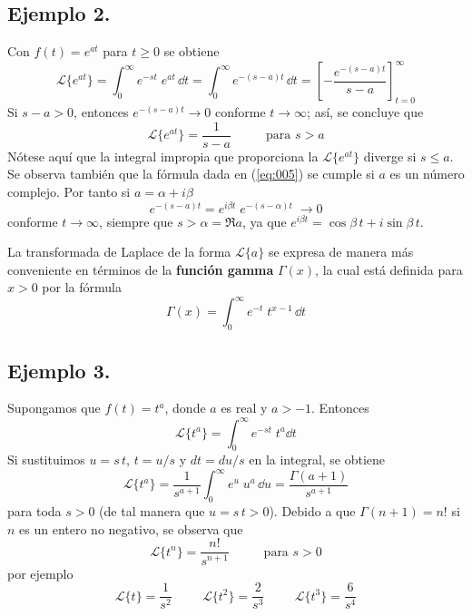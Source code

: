 \subsection*{Ejemplo 2.}
Con $f(t) = e^{at}$ para $t \geq 0$ se obtiene
\[ \mathscr{L} \{ e^{at} \} = \int_{0}^{\infty} e^{-st} \; e^{at} \, \dd t = \int_{0}^{\infty} e^{-(s - a)t} \, \dd t =  \left[ - \dfrac{e^{-(s - a)t}}{s - a} \right]_{t=0}^{\infty}  \]
Si $s -a > 0$, entonces $e^{-(s - a) t} \to 0$ conforme $t \to \infty$; así, se concluye que
\begin{equation}
\mathscr{L} \{ e^{at} \} = \dfrac{1}{s - a} \hspace{1cm} \mbox{ para } s > a
\label{eq:005}
\end{equation}
Nótese aquí que la integral impropia que proporciona la $\mathscr{L} \{ e^{at} \}$ diverge si $s \leq a$. Se observa también que la fórmula dada en (\ref{eq:005}) se cumple si $a$ es un número complejo. Por tanto si $a = \alpha + i \beta$
 \[ e^{-(s - a)t} = e^{i \beta t} \; e^{-(s - \alpha) t} \; \to 0 \]
conforme $t \to \infty$, siempre que $s > \alpha = \Re{a}$, ya que $e^{i \beta t} = \cos \beta \, t + i \sin \beta \, t$.
\par
La transformada de Laplace de la forma $\mathscr{L} \{ a \}$ se expresa de manera más conveniente en términos de la \textbf{función gamma} $\Gamma(x)$, la cual está definida para $x > 0$ por la fórmula
\begin{equation}
\Gamma (x) = \int_{0}^{\infty} e^{-t} \; t^{x-1} \, \dd t
\label{eq:006}
\end{equation}
\subsection*{Ejemplo 3.}
Supongamos que $f(t) = t^{a}$, donde $a$ es real y $a > -1$. Entonces
\[ \mathscr{L} \{ t^{a} \} = \int_{0}^{\infty} e^{-st} \; t^{a} \dd t \]
Si sustituimos $u = s \, t$, $t =  u/s$ y $dt = du/s$ en la integral, se obtiene
\begin{equation}
\mathscr{L} \{ t^{a} \} =  \dfrac{1}{s^{a+1}} \int_{0}^{\infty} e^{u} \; u^{a} \, \dd u = \dfrac{\Gamma(a + 1)}{s^{a + 1}}
\label{eq:010}
\end{equation}
para toda $s > 0$ (de tal manera que $u = s \, t > 0$). Debido a que $\Gamma(n+1) = n!$ si $n$ es un entero no negativo, se observa que
\begin{equation}
\mathscr{L} \{ t^{n} \} = \dfrac{n!}{s^{n+1}} \hspace{1cm} \mbox{ para } s > 0
\label{eq:011}
\end{equation}
por ejemplo
\[ \mathscr{L} \{ t \} = \dfrac{1}{s^{2}} \hspace{1cm} \mathscr{L} \{ t^{2} \} = \dfrac{2}{s^{3}} \hspace{1cm} \mathscr{L} \{ t^{3} \} = \dfrac{6}{s^{4}} \]
